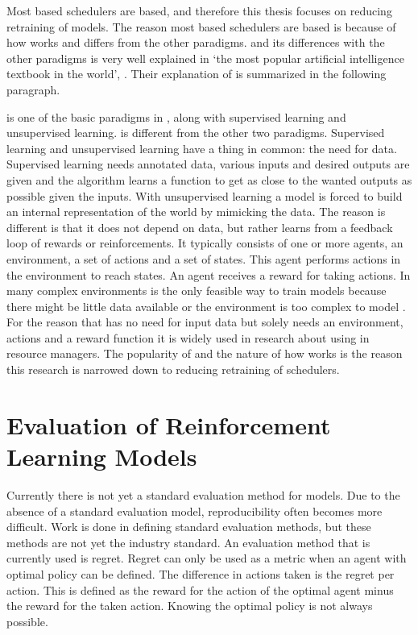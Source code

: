 Most \ml based schedulers are \rl based, and therefore this thesis
focuses on reducing retraining of \rl models. The reason most \ml based
schedulers are \rl based is because of how \rl works and differs from the other
\ml paradigms. \rl and its differences with the other paradigms is very well
explained in `the most popular artificial intelligence textbook in the
world'\footnotemark, . Their explanation of \rl is
summarized in the following paragraph.


\rl is one of the basic paradigms in \ml, along with supervised
learning and unsupervised learning. \rl is different from the other two
paradigms. Supervised learning and unsupervised learning have a thing in
common: the need for data. Supervised learning needs annotated data, various
inputs and desired outputs are given and the algorithm learns a function to
get as close to the wanted outputs as possible given the inputs. With
unsupervised learning a model is forced to build an internal representation of
the world by mimicking the data. The reason \rl is different is that it does
not depend on data, but rather learns from a feedback loop of rewards or
reinforcements. It typically consists of one or more agents, an environment, a
set of actions and a set of states. This agent performs actions in the
environment to reach states. An agent receives a reward for taking actions. In
many complex environments \rl is the only feasible way to train models because
there might be little data available or the environment is too complex to
model \cite{russell2010}. For the reason that \rl has no need for input data
but solely needs an environment, actions and a reward function it is widely
used in research about using \ai in resource managers. The popularity of \rl and
the nature of how \rl works is the reason this research is narrowed down to
reducing retraining of \rl schedulers.


\section{Evaluation of Reinforcement Learning Models}

Currently there is not yet a standard evaluation method for \rl models. Due to
the absence of a standard evaluation model, reproducibility often becomes more
difficult. Work is done in defining standard evaluation methods, but these
methods are not yet the industry standard. An evaluation method that is
currently used is regret. Regret can only be used as a metric when an agent
with optimal policy can be defined. The difference in actions taken is the
regret per action. This is defined as the reward for the action of the optimal
agent minus the reward for the taken action. Knowing the optimal policy is not
always possible.

